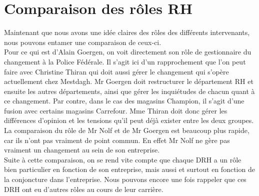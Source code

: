 \section{Comparaison des rôles RH}

Maintenant que nous avons une idée claires des rôles des différents intervenants, nous pouvons entamer une comparaison de ceux-ci. \\


Pour ce qui est d'Alain Goergen, on voit directement son rôle de gestionnaire du changement à la Police Fédérale. Il s'agit ici d'un rapprochement que l'on peut faire avec Christine Thiran qui doit aussi gérer le changement qui s'opère actuellement chez Mestdagh. Mr Goergen doit restructurer le département RH et ensuite les autres départements, ainsi que gérer les inquiétudes de chacun quant à ce changement. Par contre, dans le cas des magasins Champion, il s'agit d'une fusion avec certains magasins Carrefour. Mme Thiran doit donc gérer les différences d'opinion et les tensions qu'il peut déjà exister entre les deux groupes. \\

La comparaison du rôle de Mr Nolf et de Mr Goergen est beaucoup plus rapide, car ils n'ont pas vraiment de point commun. En effet Mr Nolf ne gère pas vraiment un changement au sein de son entreprise. \\

Suite à cette comparaison, on se rend vite compte que chaque DRH a un rôle bien particulier en fonction de son entreprise, mais aussi et surtout en fonction de la conjoncture dans l'entreprise. Nous pouvons encore une fois rappeler que ces DRH ont eu d'autres rôles au cours de leur carrière. 
